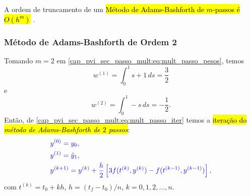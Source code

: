 \begin{obs}
  A ordem de truncamento de um \hl{Método de Adams-Bashforth de $m$-passos é $O(h^m)$} \cite{Burden2016a}.
\end{obs}

\subsubsection{Método de Adams-Bashforth de Ordem 2}

Tomando $m=2$ em \eqref{cap_pvi_sec_passo_mult:eq:mult_passo_pesos}, temos
\begin{equation}
  w^{(1)} = \int_0^1 s+1\,ds = \frac{3}{2}
\end{equation}
e
\begin{equation}
  w^{(2)} = \int_0^1 -s\,ds = -\frac{1}{2}.
\end{equation}
Então, de \eqref{cap_pvi_sec_passo_mult:eq:mult_passo_iter} temos a \hl{iteração do \emph{método de Adams-Bashforth de $2$ passos}}:
\begin{equation}\label{cap_pvi_sec_passo_mult:eq:iter_ab2}\color{blue}\begin{aligned}
    &y^{(0)} = y_0,\\
    &y^{(1)} = \tilde{y}_1,\\
    &y^{(k+1)} = y^{(k)} + \frac{h}{2}\left[3f(t^{(k)},y^{(k)}) - f(t^{(k-1)},y^{(k-1)})\right],
  \end{aligned}
\end{equation}
com $t^{(k)} = t_0 + kh$, $h = (t_f - t_0)/n$, $k = 0, 1, 2, \dotsc, n$.

